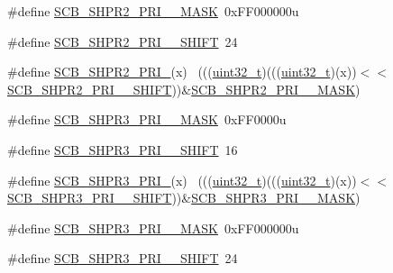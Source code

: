 \begin{DoxyCompactItemize}
\item 
\#define \hyperlink{group___s_c_b___register___masks_ga3d791e5cf57bac7bf773150ba1f0683e}{S\+C\+B\+\_\+\+S\+H\+P\+R2\+\_\+\+P\+R\+I\+\_\+\_\+\+M\+A\+SK}~0x\+F\+F000000u
\item 
\#define \hyperlink{group___s_c_b___register___masks_ga4ccb3e607c07307c5ee1c749ff8da4ca}{S\+C\+B\+\_\+\+S\+H\+P\+R2\+\_\+\+P\+R\+I\+\_\+\_\+\+S\+H\+I\+FT}~24
\item 
\#define \hyperlink{group___s_c_b___register___masks_gafb1a543618040a0c1cde2d050554e99b}{S\+C\+B\+\_\+\+S\+H\+P\+R2\+\_\+\+P\+R\+I\+\_}(x)                                        ~(((\hyperlink{_p_e___types_8h_a33594304e786b158f3fb30289278f5af}{uint32\+\_\+t})(((\hyperlink{_p_e___types_8h_a33594304e786b158f3fb30289278f5af}{uint32\+\_\+t})(x))$<$$<$\hyperlink{group___s_c_b___register___masks_ga4ccb3e607c07307c5ee1c749ff8da4ca}{S\+C\+B\+\_\+\+S\+H\+P\+R2\+\_\+\+P\+R\+I\+\_\+\_\+\+S\+H\+I\+FT}))\&\hyperlink{group___s_c_b___register___masks_ga3d791e5cf57bac7bf773150ba1f0683e}{S\+C\+B\+\_\+\+S\+H\+P\+R2\+\_\+\+P\+R\+I\+\_\+\_\+\+M\+A\+SK})
\item 
\#define \hyperlink{group___s_c_b___register___masks_ga9f73cd19baa16589b1ea9b2049617e97}{S\+C\+B\+\_\+\+S\+H\+P\+R3\+\_\+\+P\+R\+I\+\_\+\_\+\+M\+A\+SK}~0x\+F\+F0000u
\item 
\#define \hyperlink{group___s_c_b___register___masks_ga10c07d5bebf4f0032304b2d73da48a48}{S\+C\+B\+\_\+\+S\+H\+P\+R3\+\_\+\+P\+R\+I\+\_\+\_\+\+S\+H\+I\+FT}~16
\item 
\#define \hyperlink{group___s_c_b___register___masks_gac0a05c0c7e3f7ddc6285c653c190a2d7}{S\+C\+B\+\_\+\+S\+H\+P\+R3\+\_\+\+P\+R\+I\+\_}(x)                                        ~(((\hyperlink{_p_e___types_8h_a33594304e786b158f3fb30289278f5af}{uint32\+\_\+t})(((\hyperlink{_p_e___types_8h_a33594304e786b158f3fb30289278f5af}{uint32\+\_\+t})(x))$<$$<$\hyperlink{group___s_c_b___register___masks_ga10c07d5bebf4f0032304b2d73da48a48}{S\+C\+B\+\_\+\+S\+H\+P\+R3\+\_\+\+P\+R\+I\+\_\+\_\+\+S\+H\+I\+FT}))\&\hyperlink{group___s_c_b___register___masks_ga9f73cd19baa16589b1ea9b2049617e97}{S\+C\+B\+\_\+\+S\+H\+P\+R3\+\_\+\+P\+R\+I\+\_\+\_\+\+M\+A\+SK})
\item 
\#define \hyperlink{group___s_c_b___register___masks_gad0d8244bc4b757250164da7a7f5406ce}{S\+C\+B\+\_\+\+S\+H\+P\+R3\+\_\+\+P\+R\+I\+\_\+\_\+\+M\+A\+SK}~0x\+F\+F000000u
\item 
\#define \hyperlink{group___s_c_b___register___masks_ga28a5f46e257ba81d93a426436b8c795a}{S\+C\+B\+\_\+\+S\+H\+P\+R3\+\_\+\+P\+R\+I\+\_\+\_\+\+S\+H\+I\+FT}~24

\end{DoxyCompactItemize}
